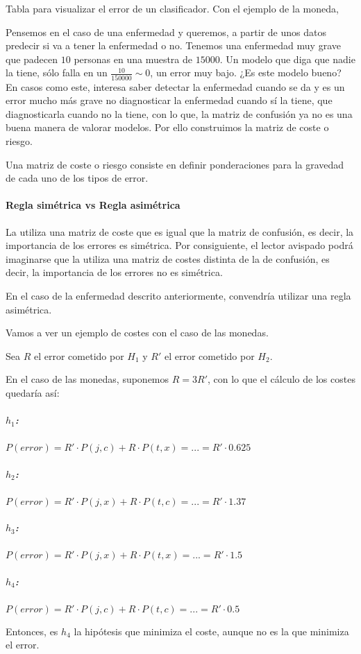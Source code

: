 \documentclass{apuntes}
\begin{document}
 \begin{defn}
 	Tabla para visualizar el error de un clasificador. Con el ejemplo de la moneda,


 \end{defn}

Pensemos en el caso de una enfermedad y queremos, a partir de unos datos predecir si va a tener la enfermedad o no. Tenemos una enfermedad muy grave que padecen $10$ personas en una muestra de $15000$. Un modelo que diga que nadie la tiene, sólo falla en un $\frac{10}{150000} \sim 0$, un error muy bajo. ¿Es este modelo bueno? En casos como este, interesa saber detectar la enfermedad cuando se da y es un error mucho más grave no diagnosticar la enfermedad cuando sí la tiene, que diagnosticarla cuando no la tiene, con lo que, la matriz de confusión ya no es una buena manera de valorar modelos. Por ello construimos la matriz de coste o riesgo.

\begin{defn}
	Una matriz de coste o riesgo consiste en definir ponderaciones para la gravedad de cada uno de los tipos de error. 
\end{defn}


\paragraph{Regla simétrica vs Regla asimétrica}
 La  utiliza una matriz de coste que es igual que la matriz de confusión, es decir, la importancia de los errores es simétrica.  Por consiguiente, el lector avispado podrá imaginarse que la  utiliza una matriz de costes distinta de la de confusión, es decir, la importancia de los errores no es simétrica.

 En el caso de la enfermedad descrito anteriormente, convendría utilizar una regla asimétrica. 

 \begin{example}
Vamos a ver un ejemplo de costes con el caso de las monedas. 

Sea $R$ el error cometido por $H_1$ y $R'$ el error cometido por $H_2$. 

En el caso de las monedas, suponemos $R = 3R'$, con lo que el cálculo de los costes quedaría así:


\subparagraph{$h_1$:} $P(error) = R' · P(j,c) + R · P(t,x) = ... = R' · 0.625$
\subparagraph{$h_2$:} $P(error) = R' · P(j,x) + R · P(t,c) = ... = R' · 1.37$
\subparagraph{$h_3$:} $P(error) = R' · P(j,x) + R · P(t,x) = ... = R' · 1.5$
\subparagraph{$h_4$:} $P(error) = R' · P(j,c) + R · P(t,c) = ... = R' · 0.5$

Entonces, es $h_4$ la hipótesis que minimiza el coste, aunque no es la que minimiza el error.


 \end{example}
\end{document}
